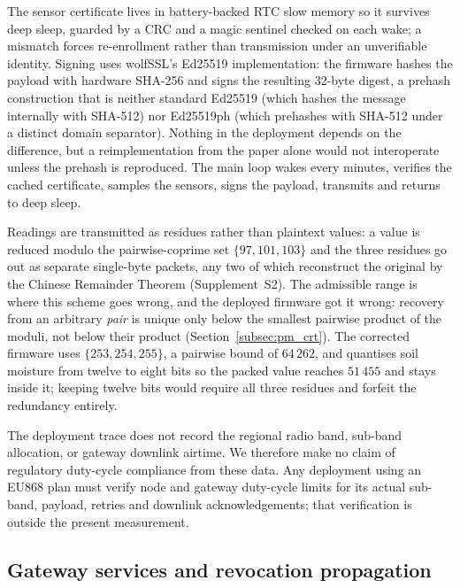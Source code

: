 \documentclass[a4paper,fleqn]{cas-dc}
\begin{document}
The sensor certificate lives in battery-backed RTC slow memory so it
survives deep sleep, guarded by a CRC and a magic sentinel checked on each
wake; a mismatch forces re-enrollment rather than transmission under an
unverifiable identity. Signing uses wolfSSL's Ed25519 implementation: the
firmware hashes the payload with hardware SHA-256 and signs the resulting
32-byte digest, a prehash construction that is neither standard Ed25519
(which hashes the message internally with SHA-512) nor Ed25519ph (which
prehashes with SHA-512 under a distinct domain separator). Nothing in the
deployment depends on the difference, but a reimplementation from the
paper alone would not interoperate unless the prehash is reproduced. The
main loop wakes every \DutyCycleMinutes{} minutes, verifies the cached
certificate, samples the sensors, signs the payload, transmits and returns
to deep sleep.

Readings are transmitted as residues rather than plaintext values: a value
is reduced modulo the pairwise-coprime set $\{97, 101, 103\}$ and the three
residues go out as separate single-byte packets, any two of which
reconstruct the original by the Chinese Remainder Theorem
\cite{garner1959residue} (Supplement~S2). The admissible range is where
this scheme goes wrong, and the deployed firmware got it wrong: recovery
from an arbitrary \emph{pair} is unique only below the smallest pairwise
product of the moduli, not below their product (Section~\ref{subsec:pm_crt}).
The corrected firmware uses $\{253, 254, 255\}$, a pairwise bound of
$64\,262$, and quantises soil moisture from twelve to eight bits so the
packed value reaches $51\,455$ and stays inside it; keeping twelve bits
would require all three residues and forfeit the redundancy entirely.

The deployment trace does not record the regional radio band, sub-band
allocation, or gateway downlink airtime. We therefore make no claim of
regulatory duty-cycle compliance from these data. Any deployment using an
EU868 plan must verify node and gateway duty-cycle limits for its actual
sub-band, payload, retries and downlink acknowledgements; that verification
is outside the present measurement.

\subsection{Gateway services and revocation propagation}
\label{subsec:gateway}
\end{document}
